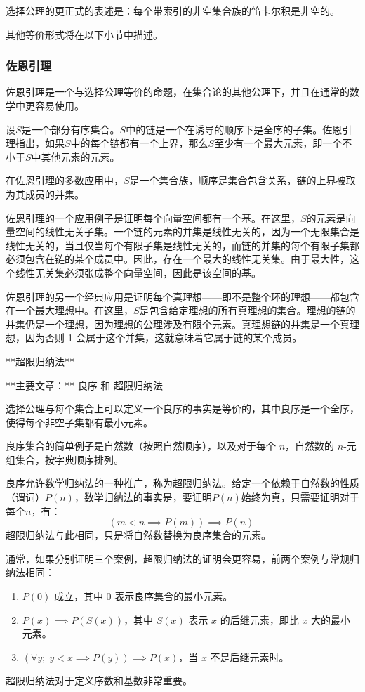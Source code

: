 选择公理的更正式的表述是：每个带索引的非空集合族的笛卡尔积是非空的。

其他等价形式将在以下小节中描述。
\subsubsection{佐恩引理}
佐恩引理是一个与选择公理等价的命题，在集合论的其他公理下，并且在通常的数学中更容易使用。

设\( S \)是一个部分有序集合。\( S \)中的链是一个在诱导的顺序下是全序的子集。佐恩引理指出，如果\( S \)中的每个链都有一个上界，那么\( S \)至少有一个最大元素，即一个不小于\( S \)中其他元素的元素。

在佐恩引理的多数应用中，\( S \)是一个集合族，顺序是集合包含关系，链的上界被取为其成员的并集。

佐恩引理的一个应用例子是证明每个向量空间都有一个基。在这里，\( S \)的元素是向量空间的线性无关子集。一个链的元素的并集是线性无关的，因为一个无限集合是线性无关的，当且仅当每个有限子集是线性无关的，而链的并集的每个有限子集都必须包含在链的某个成员中。因此，存在一个最大的线性无关集。由于最大性，这个线性无关集必须张成整个向量空间，因此是该空间的基。

佐恩引理的另一个经典应用是证明每个真理想——即不是整个环的理想——都包含在一个最大理想中。在这里，\( S \)是包含给定理想的所有真理想的集合。理想的链的并集仍是一个理想，因为理想的公理涉及有限个元素。真理想链的并集是一个真理想，因为否则 1 会属于这个并集，这就意味着它属于链的某个成员。

**超限归纳法**

**主要文章：** 良序 和 超限归纳法

选择公理与每个集合上可以定义一个良序的事实是等价的，其中良序是一个全序，使得每个非空子集都有最小元素。

良序集合的简单例子是自然数（按照自然顺序），以及对于每个 \( n \)，自然数的 \( n \)-元组集合，按字典顺序排列。

良序允许数学归纳法的一种推广，称为超限归纳法。给定一个依赖于自然数的性质（谓词）\( P(n) \)，数学归纳法的事实是，要证明\( P(n) \)始终为真，只需要证明对于每个\( n \)，有：
\[
(m < n \implies P(m)) \implies P(n)~
\]
超限归纳法与此相同，只是将自然数替换为良序集合的元素。

通常，如果分别证明三个案例，超限归纳法的证明会更容易，前两个案例与常规归纳法相同：
\begin{enumerate}
\item  \( P(0) \) 成立，其中 \( 0 \) 表示良序集合的最小元素。
\item \( P(x) \implies P(S(x)) \)，其中 \( S(x) \) 表示 \( x \) 的后继元素，即比 \( x \) 大的最小元素。
\item \( (\forall y; \; y < x \implies P(y)) \implies P(x) \)，当 \( x \) 不是后继元素时。
\end{enumerate}
超限归纳法对于定义序数和基数非常重要。
